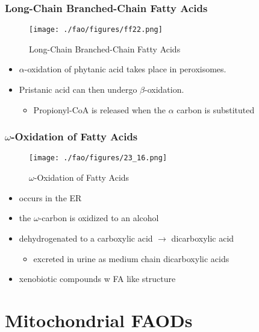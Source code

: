 \documentclass{scrartcl}
\begin{document}
\subsubsection{Long-Chain Branched-Chain Fatty Acids}
\label{sec:org100dfd6}

\begin{figure}[htbp]
\centering
\texttt{[image: ./fao/figures/ff22.png]}
\caption{\label{fig:orgf1236dd}
Long-Chain Branched-Chain Fatty Acids}
\end{figure}

\begin{itemize}
\item \(\alpha\)-oxidation of phytanic acid takes place in peroxisomes.
\item Pristanic acid can then undergo \(\beta\)-oxidation.
\begin{itemize}
\item Propionyl-CoA is released when the \(\alpha\) carbon is substituted
\end{itemize}
\end{itemize}

\subsubsection{\(\omega\)-Oxidation of Fatty Acids}
\label{sec:org8892d6a}

\begin{figure}[htbp]
\centering
\texttt{[image: ./fao/figures/23\_16.png]}
\caption{\label{fig:org13f60f5}
\(\omega\)-Oxidation of Fatty Acids}
\end{figure}

\begin{itemize}
\item occurs in the ER
\item the \(\omega\)-carbon is oxidized to an alcohol
\item dehydrogenated to a carboxylic acid \(\to\) dicarboxylic acid
\begin{itemize}
\item excreted in urine as medium chain dicarboxylic acids
\end{itemize}
\item xenobiotic compounds w FA like structure
\end{itemize}
\section{Mitochondrial FAODs}
\label{sec:orgda98058}
\end{document}
